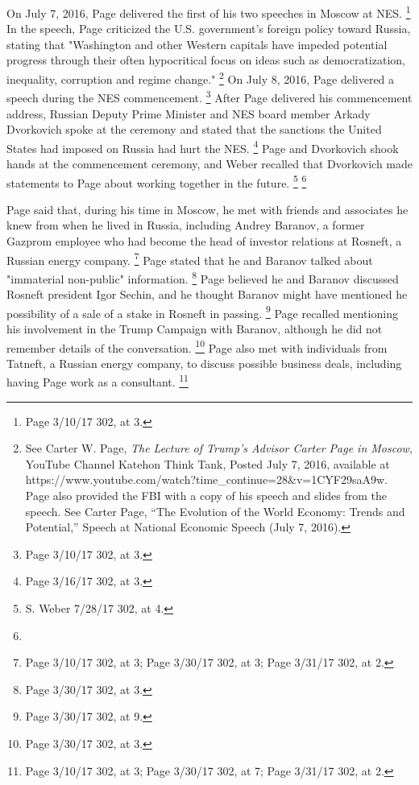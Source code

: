 On July 7, 2016, Page delivered the first of his two speeches in Moscow at NES. %
\footnote{Page 3/10/17 302, at 3.}
In the speech, Page criticized the U.S. government's foreign policy toward Russia, stating that "Washington and other Western capitals have impeded potential progress through their often hypocritical focus on ideas such as democratization, inequality, corruption and regime change."%
\footnote{See Carter W. Page, \textit{The Lecture of Trump’s Advisor Carter Page in Moscow}, YouTube Channel Katehon Think Tank, Posted July 7, 2016,
available at https://www.youtube.com/watch?time\_continue=28\&v=1CYF29saA9w.
Page also provided the FBI with a copy of his speech and slides from the speech.
See Carter Page, “The Evolution of the World Economy: Trends and Potential,” Speech at National Economic Speech (July 7, 2016).}
On July 8, 2016, Page delivered a speech during the NES commencement.%
\footnote{Page 3/10/17 302, at 3.}
After Page delivered his commencement address, Russian Deputy Prime Minister and NES board member Arkady Dvorkovich spoke at the ceremony and stated that the sanctions the United States had imposed on Russia had hurt the NES.%
\footnote{Page 3/16/17 302, at 3.}
Page and Dvorkovich shook hands at the commencement ceremony, and Weber recalled that Dvorkovich made statements to Page about working together in the future.%
\footnote{S. Weber 7/28/17 302, at 4.}
\footnote{}

Page said that, during his time in Moscow, he met with friends and associates he knew from when he lived in Russia, including Andrey Baranov, a former Gazprom employee who had become the head of investor relations at Rosneft, a Russian energy company.%
\footnote{Page 3/10/17 302, at 3;
Page 3/30/17 302, at 3;
Page 3/31/17 302, at 2.}
Page stated that he and Baranov talked about "immaterial non-public" information.%
\footnote{Page 3/30/17 302, at 3.}
Page believed he and Baranov discussed Rosneft president Igor Sechin, and he thought Baranov might have mentioned he possibility of a sale of a stake in Rosneft in passing.%
\footnote{Page 3/30/17 302, at 9. }
Page recalled mentioning his involvement in the Trump Campaign with Baranov, although he did not remember details of the conversation.%
\footnote{ Page 3/30/17 302, at 3.}
Page also met with individuals from Tatneft, a Russian energy company, to discuss possible business deals, including having Page work as a consultant.%
\footnote{Page 3/10/17 302, at 3;
Page 3/30/17 302, at 7;
Page 3/31/17 302, at 2.}

